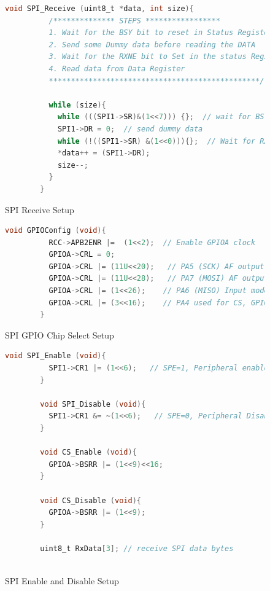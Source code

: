 \documentclass{report}
\begin{document}
\begin{figure}
      \begin{lstlisting}[language=C]
        void SPI_Receive (uint8_t *data, int size){
          /************** STEPS *****************
          1. Wait for the BSY bit to reset in Status Register
          2. Send some Dummy data before reading the DATA
          3. Wait for the RXNE bit to Set in the status Register
          4. Read data from Data Register
          ************************************************/

          while (size){
            while (((SPI1->SR)&(1<<7))) {};  // wait for BSY bit to Reset -> This will indicate that SPI is not busy in communication
            SPI1->DR = 0;  // send dummy data
            while (!((SPI1->SR) &(1<<0))){};  // Wait for RXNE to set -> This will indicate that the Rx buffer is not empty
            *data++ = (SPI1->DR);
            size--;
          }
        }
      \end{lstlisting}
      \caption{SPI Receive Setup}
      \label{fig:SPI_Receive}
    \end{figure}

\begin{figure}
      \begin{lstlisting}[language=C]
        void GPIOConfig (void){
          RCC->APB2ENR |=  (1<<2);  // Enable GPIOA clock
          GPIOA->CRL = 0;
          GPIOA->CRL |= (11U<<20);   // PA5 (SCK) AF output Push Pull
          GPIOA->CRL |= (11U<<28);   // PA7 (MOSI) AF output Push Pull
          GPIOA->CRL |= (1<<26);    // PA6 (MISO) Input mode (floating)
          GPIOA->CRL |= (3<<16);    // PA4 used for CS, GPIO Output
        }
	    \end{lstlisting}
    \caption{SPI GPIO Chip Select Setup}
    \label{fig:GPIOConfig}
\end{figure}

\begin{figure}
      \begin{lstlisting}[language=C]
        void SPI_Enable (void){
          SPI1->CR1 |= (1<<6);   // SPE=1, Peripheral enabled
        }

        void SPI_Disable (void){
          SPI1->CR1 &= ~(1<<6);   // SPE=0, Peripheral Disabled
        }

        void CS_Enable (void){
          GPIOA->BSRR |= (1<<9)<<16;
        }

        void CS_Disable (void){
          GPIOA->BSRR |= (1<<9);
        }

        uint8_t RxData[3]; // receive SPI data bytes
        
        \end{lstlisting}
        \caption{SPI Enable and Disable Setup}
        \label{fig:SPI_Enable}
    \end{figure}
\end{document}
